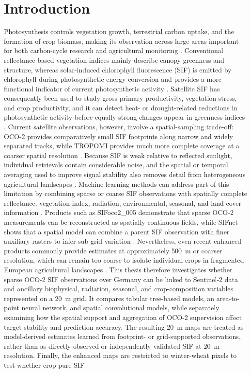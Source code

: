 \chapter{Introduction\label{cha:chapter1}}
Photosynthesis controls vegetation growth, terrestrial carbon uptake, and the formation of crop biomass, making its observation across large areas important for both carbon-cycle research and agricultural monitoring \cite{guan2016improving,he2020ground}. Conventional reflectance-based vegetation indices mainly describe canopy greenness and structure, whereas solar-induced chlorophyll fluorescence (SIF) is emitted by chlorophyll during photosynthetic energy conversion and provides a more functional indicator of current photosynthetic activity \cite{gensheimer2022convolutional,yu2019high}. Satellite SIF has consequently been used to study gross primary productivity, vegetation stress, and crop productivity, and it can detect heat- or drought-related reductions in photosynthetic activity before equally strong changes appear in greenness indices \cite{qiu2022monitoring,song2018satellite,peng2020assessing}. Current satellite observations, however, involve a spatial-sampling trade-off: OCO-2 provides comparatively small SIF footprints along narrow and widely separated tracks, while TROPOMI provides much more complete coverage at a coarser spatial resolution \cite{yu2019high,gensheimer2022convolutional}. Because SIF is weak relative to reflected sunlight, individual retrievals contain considerable noise, and the spatial or temporal averaging used to improve signal stability also removes detail from heterogeneous agricultural landscapes \cite{yu2019high}. Machine-learning methods can address part of this limitation by combining sparse or coarse SIF observations with spatially complete reflectance, vegetation-index, radiation, environmental, seasonal, and land-cover information \cite{li2019global,zhang2018global,gensheimer2022convolutional}. Products such as SIFoco2\_005 demonstrate that sparse OCO-2 measurements can be reconstructed as spatially continuous fields, while SIFnet shows that a spatial model can combine a parent SIF observation with finer auxiliary rasters to infer sub-grid variation \cite{yu2019high,gensheimer2022convolutional}. Nevertheless, even recent enhanced products commonly provide estimates at approximately 500~m or coarser resolution, which can remain too coarse to isolate individual crops in fragmented European agricultural landscapes \cite{gensheimer2022convolutional,du2025cnsif}. This thesis therefore investigates whether sparse OCO-2 SIF observations over Germany can be linked to Sentinel-2 data and ancillary biophysical, radiation, seasonal, and crop-composition variables represented on a 20~m grid. It compares tabular tree-based models, an area-to-point neural network, and spatial convolutional models, while separately examining how the spatial support and aggregation of OCO-2 supervision affect target stability and prediction accuracy. The resulting 20~m maps are treated as model-derived estimates learned from footprint- or grid-supported observations, rather than as directly observed or independently validated SIF at 20~m resolution. Finally, the enhanced maps are restricted to winter-wheat pixels to test whether crop-pure SIF 